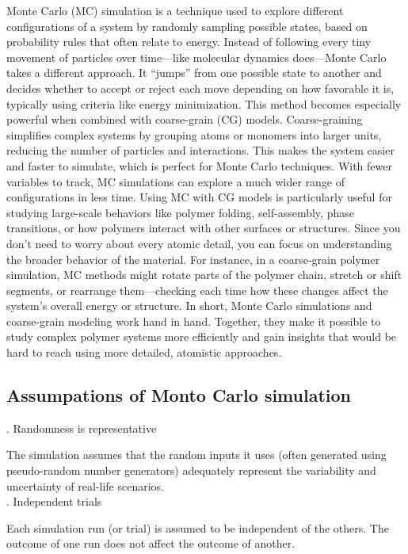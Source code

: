 \documentclass[12pt]{article}
\begin{document}
\begin{flushleft}
Monte Carlo (MC) simulation is a technique used to explore different configurations of a system by randomly sampling possible states, based on probability rules that often relate to energy. Instead of following every tiny movement of particles over time—like molecular dynamics does—Monte Carlo takes a different approach. It “jumps” from one possible state to another and decides whether to accept or reject each move depending on how favorable it is, typically using criteria like energy minimization.
This method becomes especially powerful when combined with coarse-grain (CG) models. Coarse-graining simplifies complex systems by grouping atoms or monomers into larger units, reducing the number of particles and interactions. This makes the system easier and faster to simulate, which is perfect for Monte Carlo techniques. With fewer variables to track, MC simulations can explore a much wider range of configurations in less time.
Using MC with CG models is particularly useful for studying large-scale behaviors like polymer folding, self-assembly, phase transitions, or how polymers interact with other surfaces or structures. Since you don’t need to worry about every atomic detail, you can focus on understanding the broader behavior of the material. For instance, in a coarse-grain polymer simulation, MC methods might rotate parts of the polymer chain, stretch or shift segments, or rearrange them—checking each time how these changes affect the system’s overall energy or structure.
In short, Monte Carlo simulations and coarse-grain modeling work hand in hand. Together, they make it possible to study complex polymer systems more efficiently and gain insights that would be hard to reach using more detailed, atomistic approaches.

\vspace{-1em} 
\subsection*{Assumpations of Monto Carlo simulation}


. Randomness is representative
    
The simulation assumes that the random inputs it uses (often generated using pseudo-random number generators) adequately represent the variability and uncertainty of real-life scenarios.\\

. Independent trials
    
Each simulation run (or trial) is assumed to be independent of the others. The outcome of one run does not affect the outcome of another.


\end{flushleft}
\end{document}
